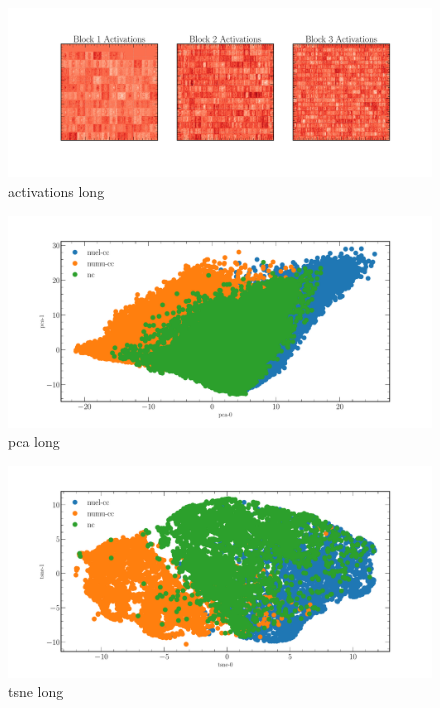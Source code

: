 \begin{figure}
    \includegraphics[width=\textwidth]{diagrams/6-cvn/chipsnet/activations.pdf}
    \caption[activations short]
    {activations long}
    \label{fig:activations}
\end{figure}

\begin{figure}
    \includegraphics[width=\textwidth]{diagrams/6-cvn/chipsnet/pca.pdf}
    \caption[pca short]
    {pca long}
    \label{fig:pca}
\end{figure}

\begin{figure}
    \includegraphics[width=\textwidth]{diagrams/6-cvn/chipsnet/tsne.pdf}
    \caption[tsne short]
    {tsne long}
    \label{fig:tsne}
\end{figure}

